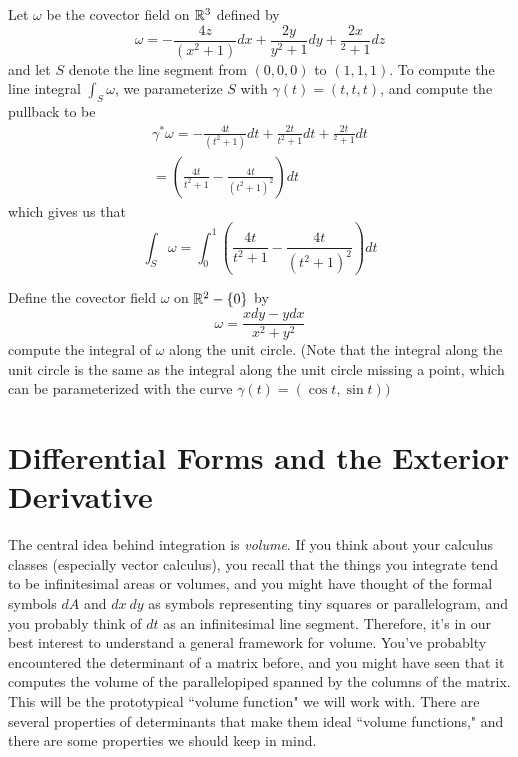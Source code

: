 \begin{exmp}
Let $\omega$ be the covector field on $\mathbb{R}^3$ defined by
$$\omega = -\frac{4z}{(x^2 + 1)} dx + \frac{2y}{y^2 + 1}dy + \frac{2x}{^2 + 1} dz $$
and let $S$ denote the line segment from $(0,0,0)$ to $(1,1,1)$. To compute
the line integral $\int_S \omega$, we parameterize $S$ with $\gamma(t) = (t,t,t)$,
and compute the pullback to be
\begin{align*}
\gamma^*\omega = -\frac{4t}{(t^2 + 1)} dt + \frac{2t}{t^2 + 1}dt + \frac{2t}{^2 + 1} dt \\
= \left( \frac{4t}{t^2 + 1} - \frac{4t}{(t^2 + 1)^2} \right) dt
\end{align*}
which gives us that
$$\int_S \omega = \int_0^1 \left( \frac{4t}{t^2 + 1} - \frac{4t}{(t^2 + 1)^2} \right) dt$$
\end{exmp}
%
\begin{exer}
Define the covector field $\omega$ on $\mathbb{R}^2 - \left\lbrace 0 \right\rbrace$ by
$$\omega = \frac{x dy - ydx}{x^2 + y^2} $$
compute the integral of $\omega$ along the unit circle. (Note that the integral
along the unit circle is the same as the integral along the unit circle
missing a point, which can be parameterized with the curve
$\gamma(t) = (\cos t, \sin t))$
\end{exer}
%
\section{Differential Forms and the Exterior Derivative}
%
The central idea behind integration is \emph{volume}. If you think about your
calculus classes (especially vector calculus), you recall that the things
you integrate tend to be infinitesimal areas or volumes, and you might have
thought of the formal symbols $dA$ and $dx~dy$ as symbols representing
tiny squares or parallelogram, and you probably think of $dt$ as an
infinitesimal line segment. Therefore, it's in our best interest to
understand a general framework for volume. You've probablty encountered
the determinant of a matrix before, and you might have seen that it computes
the volume of the parallelopiped spanned by the columns of the matrix. This
will be the prototypical ``volume function" we will work with. There are
several properties of determinants that make them ideal ``volume functions,"
and there are some properties we should keep in mind.  \\

